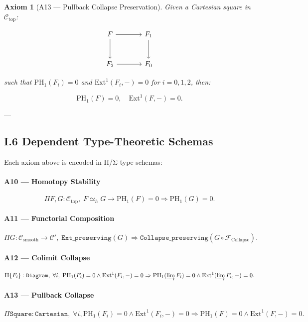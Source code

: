 \documentclass[11pt]{article}
\newtheorem{axiom}{Axiom}[section]
\begin{document}
\begin{axiom}[A13 — Pullback Collapse Preservation]
Given a Cartesian square in $\mathcal{C}_{\mathrm{top}}$:

\[
\begin{tikzcd}[row sep=large, column sep=large]
F \arrow[r] \arrow[d] & F_1 \arrow[d] \\
F_2 \arrow[r] & F_0
\end{tikzcd}
\]

such that $\mathrm{PH}_1(F_i) = 0$ and $\mathrm{Ext}^1(F_i, -) = 0$ for $i=0,1,2$, then:

\[
\mathrm{PH}_1(F) = 0, \quad \mathrm{Ext}^1(F, -) = 0.
\]
\end{axiom}

---

\subsection*{I.6 Dependent Type-Theoretic Schemas}

Each axiom above is encoded in Π/Σ-type schemas:

\paragraph{A10 — Homotopy Stability}
\[
\Pi F, G : \mathcal{C}_{\mathrm{top}}, \; F \simeq_h G \to \mathrm{PH}_1(F) = 0 \Rightarrow \mathrm{PH}_1(G) = 0.
\]

\paragraph{A11 — Functorial Composition}
\[
\Pi G : \mathcal{C}_{\mathrm{smooth}} \to \mathcal{C}', \;
\texttt{Ext\_preserving}(G) \Rightarrow \texttt{Collapse\_preserving}(G \circ \mathcal{F}_{\mathrm{Collapse}}).
\]

\paragraph{A12 — Colimit Collapse}
\[
\Pi \{F_i\} : \texttt{Diagram},\;
\forall i, \; \mathrm{PH}_1(F_i) = 0 \wedge \mathrm{Ext}^1(F_i,-) = 0
\Rightarrow \mathrm{PH}_1(\varinjlim F_i) = 0 \wedge \mathrm{Ext}^1(\varinjlim F_i,-) = 0.
\]

\paragraph{A13 — Pullback Collapse}
\[
\Pi \texttt{Square} : \texttt{Cartesian},\;
\forall i, \mathrm{PH}_1(F_i) = 0 \wedge \mathrm{Ext}^1(F_i, -) = 0 \Rightarrow \mathrm{PH}_1(F) = 0 \wedge \mathrm{Ext}^1(F, -) = 0.
\]
\end{document}
